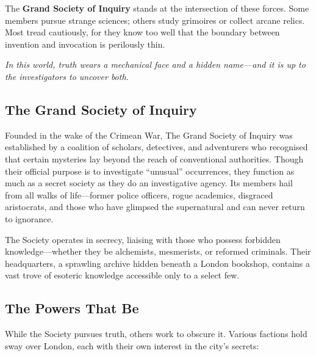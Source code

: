 The \textbf{Grand Society of Inquiry} stands at the intersection of these forces. Some members pursue strange sciences; others study grimoires or collect arcane relics. Most tread cautiously, for they know too well that the boundary between invention and invocation is perilously thin.

\textit{In this world, truth wears a mechanical face and a hidden name—and it is up to the investigators to uncover both.}

\subsection{The Grand Society of Inquiry}

Founded in the wake of the Crimean War, The Grand Society of Inquiry was established by a coalition of scholars, detectives, and adventurers who recognised that certain mysteries lay beyond the reach of conventional authorities. Though their official purpose is to investigate “unusual” occurrences, they function as much as a secret society as they do an investigative agency. Its members hail from all walks of life—former police officers, rogue academics, disgraced aristocrats, and those who have glimpsed the supernatural and can never return to ignorance.

The Society operates in secrecy, liaising with those who possess forbidden knowledge—whether they be alchemists, mesmerists, or reformed criminals. Their headquarters, a sprawling archive hidden beneath a London bookshop, contains a vast trove of esoteric knowledge accessible only to a select few.

\subsection{The Powers That Be}

While the Society pursues truth, others work to obscure it. Various factions hold sway over London, each with their own interest in the city’s secrets:

